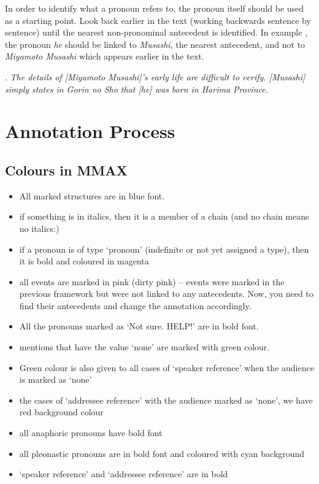 \documentclass[a4paper]{article}
\begin{document}
In order to identify what a pronoun refers to, the pronoun itself should be used as a starting point. Look back earlier in the text (working backwards sentence by sentence) until the nearest non-pronominal antecedent is identified. In example \Next, the pronoun {\sl he} should be linked to {\sl Musashi}, the nearest antecedent, and not
to {\sl Miyamoto Musashi} which appears earlier in the text.

\ex.
{\sl The details of [Miyamoto Musashi]'s early life are difficult to verify. [Musashi] simply states in Gorin no Sho that [he] was born in Harima Province.}



\section{Annotation Process}

\subsection{Colours in MMAX}

\begin{itemize}
\item All marked structures are in blue font. %
\item if something is in italics, then it is a member of a chain (and no chain means no italics:)
\item if a pronoun is of type `pronoun' (indefinite or not yet assigned a type), then it is bold and coloured in magenta %
\item all events are marked in pink (dirty pink) -- events were marked in the previous framework but were not linked to any antecedents. Now, you need to find their antecedents and change the annotation accordingly. %
\item All the pronouns marked as `Not sure. HELP!' are in bold font. %
\item mentions that have the value `none' are marked with green colour. %
 \item Green colour is also given to all cases of `speaker reference' when the audience is marked as `none' %
\item the cases of `addressee reference' with the audience marked as `none', we have red background colour %
\item all anaphoric pronouns have bold font %
\item all pleonastic pronouns are in bold font and coloured with cyan background %
\item `speaker reference' and `addressee reference' are in bold
\end{itemize}
\end{document}
